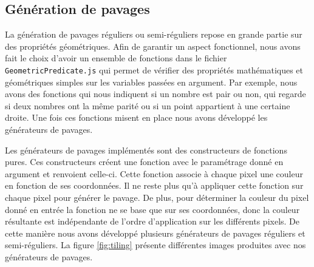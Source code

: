 \documentclass[11pt]{article}
\begin{document}
\subsection{Génération de pavages}

La génération de pavages réguliers ou semi-réguliers repose en grande partie sur des propriétés géométriques. Afin de garantir un aspect fonctionnel, nous avons fait le choix d'avoir un ensemble de fonctions dans le fichier \texttt{GeometricPredicate.js} qui permet de vérifier des propriétés mathématiques et géométriques simples sur les variables passées en argument. Par exemple, nous avons des fonctions qui nous indiquent si un nombre est pair ou non, qui regarde si deux nombres ont la même parité ou si un point appartient à une certaine droite. Une fois ces fonctions misent en place nous avons développé les générateurs de pavages.

Les générateurs de pavages implémentés sont des constructeurs de fonctions pures. Ces constructeurs créent une fonction avec le paramétrage donné en argument et renvoient celle-ci. Cette fonction associe à chaque pixel une couleur en fonction de ses coordonnées. Il ne reste plus qu'à appliquer cette fonction sur chaque pixel pour générer le pavage. De plus, pour déterminer la couleur du pixel donné en entrée la fonction ne se base que sur ses coordonnées, donc la couleur résultante est indépendante de l'ordre d'application sur les différents pixels. De cette manière nous avons développé plusieurs générateurs de pavages réguliers et semi-réguliers. La figure \ref{fig:tiling} présente différentes images produites avec nos générateurs de pavages. 
\end{document}
